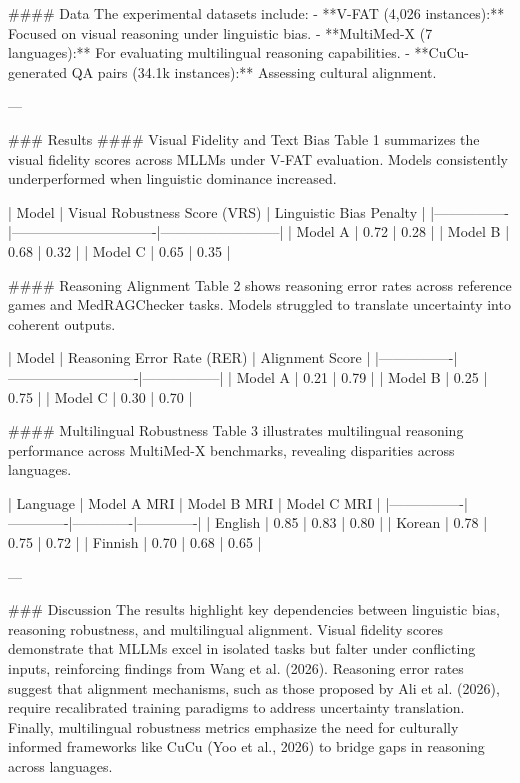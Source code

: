#### Data  
The experimental datasets include:  
- **V-FAT (4,026 instances):** Focused on visual reasoning under linguistic bias.  
- **MultiMed-X (7 languages):** For evaluating multilingual reasoning capabilities.  
- **CuCu-generated QA pairs (34.1k instances):** Assessing cultural alignment.

---

### Results  
#### Visual Fidelity and Text Bias  
Table 1 summarizes the visual fidelity scores across MLLMs under V-FAT evaluation. Models consistently underperformed when linguistic dominance increased.

| Model          | Visual Robustness Score (VRS) | Linguistic Bias Penalty |  
|----------------|-------------------------------|--------------------------|  
| Model A        | 0.72                          | 0.28                     |  
| Model B        | 0.68                          | 0.32                     |  
| Model C        | 0.65                          | 0.35                     |  

#### Reasoning Alignment  
Table 2 shows reasoning error rates across reference games and MedRAGChecker tasks. Models struggled to translate uncertainty into coherent outputs.

| Model          | Reasoning Error Rate (RER) | Alignment Score |  
|----------------|----------------------------|-----------------|  
| Model A        | 0.21                       | 0.79            |  
| Model B        | 0.25                       | 0.75            |  
| Model C        | 0.30                       | 0.70            |  

#### Multilingual Robustness  
Table 3 illustrates multilingual reasoning performance across MultiMed-X benchmarks, revealing disparities across languages.

| Language       | Model A MRI | Model B MRI | Model C MRI |  
|----------------|-------------|-------------|-------------|  
| English        | 0.85        | 0.83        | 0.80        |  
| Korean         | 0.78        | 0.75        | 0.72        |  
| Finnish        | 0.70        | 0.68        | 0.65        |  

---

### Discussion  
The results highlight key dependencies between linguistic bias, reasoning robustness, and multilingual alignment. Visual fidelity scores demonstrate that MLLMs excel in isolated tasks but falter under conflicting inputs, reinforcing findings from Wang et al. (2026). Reasoning error rates suggest that alignment mechanisms, such as those proposed by Ali et al. (2026), require recalibrated training paradigms to address uncertainty translation. Finally, multilingual robustness metrics emphasize the need for culturally informed frameworks like CuCu (Yoo et al., 2026) to bridge gaps in reasoning across languages.

